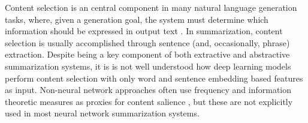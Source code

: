 Content selection is an central component in many natural language generation
tasks,
where, given a generation goal, the system must determine which information
should be expressed in output text \cite{gatt2018survey}.
In summarization, content selection is usually accomplished through sentence (and,
occasionally, phrase) extraction.
Despite being a key component of both
extractive and abstractive summarization systems, it is is not well
understood how deep learning models perform content selection with only word and 
sentence
embedding based features as input.
Non-neural network approaches often use frequency and information theoretic measures as proxies
for content salience \cite{hong2014improving}, but these are not explicitly %
used in most neural network summarization systems.


